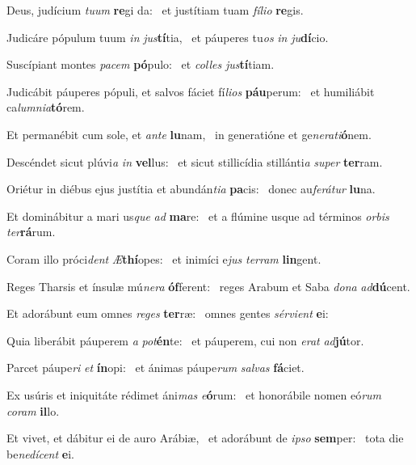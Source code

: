 \item Deus, judícium \textit{tuum} \textbf{re}gi da:~\psstar{} et justítiam tuam \textit{fílio} \textbf{re}gis.
\item Judicáre pópulum tuum \textit{in} \textit{jus}\textbf{tí}tia,~\psstar{} et páuperes tu\textit{os} \textit{in} \textit{ju}\textbf{dí}cio.
\item Suscípiant montes \textit{pacem} \textbf{pó}pulo:~\psstar{} et \textit{colles} \textit{jus}\textbf{tí}tiam.
\item Judicábit páuperes pópuli, et salvos fáciet fí\textit{lios} \textbf{páu}perum:~\psstar{} et humiliábit ca\textit{lumnia}\textbf{tó}rem.
\item Et permanébit cum sole, et \textit{ante} \textbf{lu}nam,~\psstar{} in generatióne et ge\textit{nerati}\textbf{ó}nem.
\item Descéndet sicut plúvi\textit{a} \textit{in} \textbf{vel}lus:~\psstar{} et sicut stillicídia stillánti\textit{a} \textit{super} \textbf{ter}ram.
\item Oriétur in diébus ejus justítia et abundán\textit{tia} \textbf{pa}cis:~\psstar{} donec au\textit{ferátur} \textbf{lu}na.
\item Et dominábitur a mari us\textit{que} \textit{ad} \textbf{ma}re:~\psstar{} et a flúmine usque ad términos \textit{orbis} \textit{ter}\textbf{rá}rum.
\item Coram illo próci\textit{dent} \textit{Æ}\textbf{thí}opes:~\psstar{} et inimíci e\textit{jus} \textit{terram} \textbf{lin}gent.
\item Reges Tharsis et ínsulæ mú\textit{nera} \textbf{óf}ferent:~\psstar{} reges Arabum et Saba \textit{dona} \textit{ad}\textbf{dú}cent.
\item Et adorábunt eum omnes \textit{reges} \textbf{ter}ræ:~\psstar{} omnes gentes \textit{sérvient} \textbf{e}i:
\item Quia liberábit páuperem \textit{a} \textit{pot}\textbf{én}te:~\psstar{} et páuperem, cui non \textit{erat} \textit{ad}\textbf{jú}tor.
\item Parcet páupe\textit{ri} \textit{et} \textbf{ín}opi:~\psstar{} et ánimas páupe\textit{rum} \textit{salvas} \textbf{fá}ciet.
\item Ex usúris et iniquitáte rédimet áni\textit{mas} \textit{e}\textbf{ó}rum:~\psstar{} et honorábile nomen eó\textit{rum} \textit{coram} \textbf{il}lo.
\item Et vivet, et dábitur ei de auro Arábiæ,~\pscross{} et adorábunt de \textit{ipso} \textbf{sem}per:~\psstar{} tota die be\textit{nedícent} \textbf{e}i.
